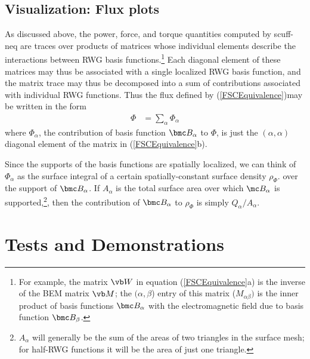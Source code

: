 \documentclass[letterpaper]{article}
\begin{document}
\subsection{Visualization: Flux plots}

As discussed above, the power, force, and torque quantities
computed by {\sc scuff-neq} are traces over products of matrices
whose individual elements describe the interactions between
RWG basis functions.\footnote{For example, the matrix $\vb W$ 
in equation (\ref{FSCEquivalence}a) is the inverse of the BEM matrix 
$\vb M$; the $(\alpha,\beta$) entry of this matrix 
($M_{\alpha\beta})$ is the inner product of basis functions 
$\bmc B_\alpha$ with the electromagnetic field due to basis
function $\bmc B_\beta$.} Each diagonal element of these
matrices may thus be associated with a single localized
RWG basis function, and the matrix trace may thus be
decomposed into a sum of contributions associated with 
individual RWG functions. Thus the flux defined
by (\ref{FSCEquivalence})may be written in the form 
\begin{align*}
 \Phi &= \sum_{\alpha} \Phi_{\alpha}
\end{align*}
where $\Phi_{\alpha}$, the contribution of basis function
$\bmc B_\alpha$ to $\Phi$, is just the $(\alpha,\alpha)$ 
diagonal element of the matrix in (\ref{FSCEquivalence}b).

Since the supports of the basis functions are spatially localized,
we can think of $\Phi_\alpha$ as the surface integral
of a certain spatially-constant surface density $\rho_\Phi.$
over the support of $\bmc B_\alpha$.
If $A_\alpha$ is the total surface area over which
$\mc B_\alpha$ is supported,\footnote{$A_\alpha$ will generally be
the sum of the areas of two triangles in the surface mesh;
for half-RWG functions it will be the area of just one
triangle.}, then the contribution of $\bmc B_\alpha$
to $\rho_\Phi$ is simply $Q_\alpha / A_\alpha$.

\newpage
\section{Tests and Demonstrations}
\end{document}
